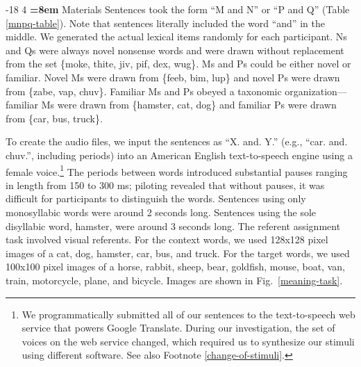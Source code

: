 \documentclass[man,longtable,floatsintext]{my-apa6}
\makeatletter
\renewcommand\subsubsection{\@startsection{subsubsection}{3}{\z@}%
                       {-18\p@ \@plus -4\p@ \@minus -4\p@}%
                       {4\p@ \@plus 2\p@ \@minus 2\p@}%
                       {\normalfont\normalsize\bfseries\boldmath
                        \rightskip=\z@ \@plus 8em\pretolerance=10000 }}
\makeatother
\begin{document}
\subsubsection{Materials}
Sentences took the form ``M and N'' or ``P and Q'' (Table \ref{mnpq-table}). Note that sentences literally included the word ``and'' in the middle. We generated the actual lexical items randomly for each participant. Ns and Qs were always novel nonsense words and were drawn without replacement from the set \{moke, thite, jiv, pif, dex, wug\}. Ms and Ps could be either novel or familiar. Novel Ms were drawn from \{feeb, bim, lup\} and novel Ps were drawn from \{zabe, vap, chuv\}. Familiar Ms and Ps obeyed a taxonomic organization---familiar Ms were drawn from \{hamster, cat, dog\} and familiar Ps were drawn from \{car, bus, truck\}.

To create the audio files, we input the sentences as ``X. and. Y.'' (e.g., ``car. and. chuv.'', including periods) into an American English text-to-speech engine using a female voice.\footnote{\label{tts} We programmatically submitted all of our sentences to the text-to-speech web service that powers Google Translate. During our investigation, the set of voices on the web service changed, which required us to synthesize our stimuli using different software. See also Footnote \ref{change-of-stimuli}.} The periods between words introduced substantial pauses ranging in length from 150 to 300 ms; piloting revealed that without pauses, it was difficult for participants to distinguish the words. Sentences using only monosyllabic words were around 2 seconds long. Sentences using the sole disyllabic word, hamster, were around 3 seconds long.  The referent assignment task involved visual referents. For the context words, we used 128x128 pixel images of a cat, dog, hamster, car, bus, and truck. For the target words, we used 100x100 pixel images of a horse, rabbit, sheep, bear, goldfish, mouse, boat, van, train, motorcycle, plane, and bicycle. Images are shown in Fig.~\ref{meaning-task}.
\end{document}
